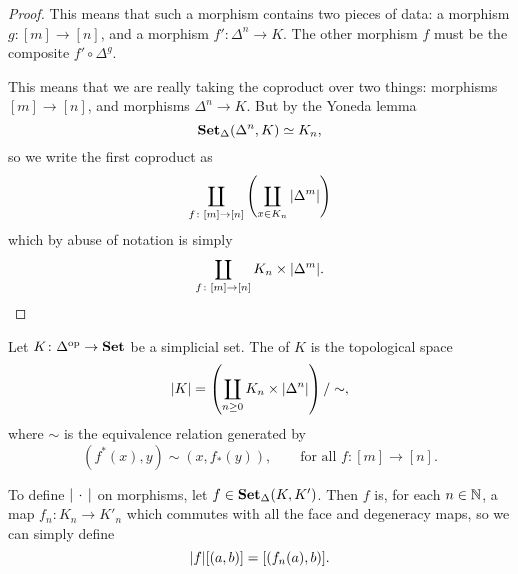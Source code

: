 \documentclass[main.tex]{subfiles}
\begin{document}
\begin{proof}
  This means that such a morphism contains two pieces of data: a morphism $g\colon [m] \to [n]$, and a morphism $f'\colon \Delta^{n} \to K$. The other morphism $f$ must be the composite $f' \circ \Delta^{g}$.
  
  This means that we are really taking the coproduct over two things: morphisms $[m] \to [n]$, and morphisms $\Delta^{n} \to K$. But by the Yoneda lemma
  \begin{equation*}
    \operatorname{\mathbf{Set}_{\Delta}}(\Delta^{n}, K) \simeq K_{n},
  \end{equation*}
  so we write the first coproduct as
  \begin{equation*}
    \coprod_{f\colon [m] \to [n]}\left( \coprod_{x \in K_{n}} {| \Delta^{m} |} \right)
  \end{equation*}
  which by abuse of notation is simply
  \begin{equation*}
    \coprod_{f\colon [m] \to [n]} K_{n} \times {| \Delta^{m} |}.
  \end{equation*}
\end{proof}

Let $K\colon \Delta^{\mathrm{op}} \to \mathbf{Set}$ be a simplicial set. The  of $K$ is the topological space
\begin{equation*}
  {| K |} = \left( \coprod_{n \geq 0} K_{n} \times {| \Delta^{n} |} \right) /\sim,
\end{equation*}
where $\sim$ is the equivalence relation generated by
\begin{equation*}
  (f^{*}(x), y) \sim (x, f_{*}(y)),\qquad \text{for all } f\colon[m] \to [n].
\end{equation*}

To define ${| \,\cdot\, |}$ on morphisms, let $f \in \operatorname{\mathbf{Set}_{\Delta}}(K, K')$. Then $f$ is, for each $n \in \mathbb{N}$, a map $f_{n}\colon K_{n} \to K'_{n}$ which commutes with all the face and degeneracy maps, so we can simply define
\begin{equation*}
  {| f |}[(a, b)] = [(f_{n}(a), b)].
\end{equation*}
\end{document}

